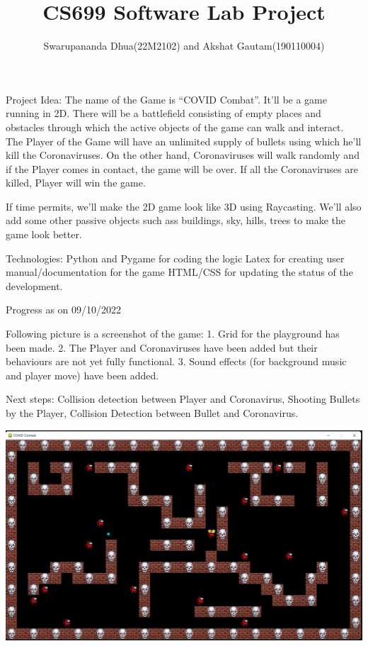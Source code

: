 \documentclass[a4paper,12pt]{report}
\title{CS699 Software Lab Project}
\author{Swarupananda Dhua(22M2102) and Akshat Gautam(190110004)}
\begin{document}
\maketitle

Project Idea: The name of the Game is “COVID Combat”. It’ll be a game running in 2D. There will be a battlefield consisting of empty places and obstacles through which the active objects of the game can walk and interact. The Player of the Game will have an unlimited supply of bullets using which he’ll kill the Coronaviruses. On the other hand, Coronaviruses will walk randomly and if the Player comes in contact, the game will be over. If all the Coronaviruses are killed, Player will win the game.

If time permits, we’ll make the 2D game look like 3D using Raycasting. We’ll also add some other passive objects such ass buildings, sky, hills, trees to make the game look better.

Technologies:
Python and Pygame for coding the logic
Latex for creating user manual/documentation for the game
HTML/CSS for updating the status of the development.


\newpage
Progress as on 09/10/2022

Following picture is a screenshot of the game:
1.	Grid for the playground has been made.
2.	The Player and Coronaviruses have been added but their behaviours are not yet fully functional.
3.	Sound effects (for background music and player move) have been added.

Next steps: Collision detection between Player and Coronavirus, Shooting Bullets by the Player, Collision Detection between Bullet and Coronavirus.

\newpage
\includegraphics[scale=0.3]{snapshot.png}
\end{document}
